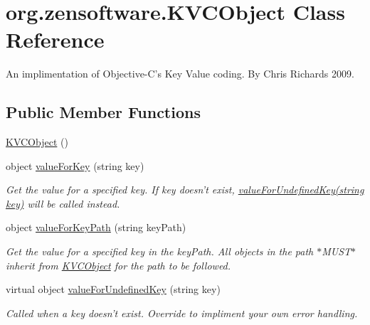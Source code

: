\hypertarget{classorg_1_1zensoftware_1_1_k_v_c_object}{
\section{org.zensoftware.KVCObject Class Reference}
\label{classorg_1_1zensoftware_1_1_k_v_c_object}
}


An implimentation of Objective-\/C's Key Value coding. By Chris Richards 2009.  
\subsection*{Public Member Functions}
\begin{DoxyCompactItemize}
\item 
\hyperlink{classorg_1_1zensoftware_1_1_k_v_c_object_afab44f2fd361e453ddafc043782af58a}{KVCObject} ()
\item 
object \hyperlink{classorg_1_1zensoftware_1_1_k_v_c_object_a5a91cba1a0416b75d8db302c61911213}{valueForKey} (string key)
\begin{DoxyCompactList}\small\item\em Get the value for a specified key. If key doesn't exist, \hyperlink{classorg_1_1zensoftware_1_1_k_v_c_object_ad2e88f59c077b45c6778710a1e086163}{valueForUndefinedKey(string key)} will be called instead. \item\end{DoxyCompactList}\item 
object \hyperlink{classorg_1_1zensoftware_1_1_k_v_c_object_a218765ff16ab97310232637f2068909c}{valueForKeyPath} (string keyPath)
\begin{DoxyCompactList}\small\item\em Get the value for a specified key in the keyPath. All objects in the path $\ast$MUST$\ast$ inherit from \hyperlink{classorg_1_1zensoftware_1_1_k_v_c_object}{KVCObject} for the path to be followed. \item\end{DoxyCompactList}\item 
virtual object \hyperlink{classorg_1_1zensoftware_1_1_k_v_c_object_ad2e88f59c077b45c6778710a1e086163}{valueForUndefinedKey} (string key)
\begin{DoxyCompactList}\small\item\em Called when a key doesn't exist. Override to impliment your own error handling. \item\end{DoxyCompactList}\item 

\end{DoxyCompactItemize}
